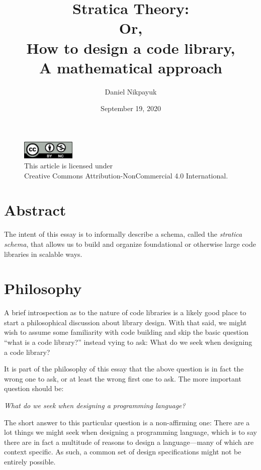 \documentclass[twoside]{article}
\title{Stratica Theory:\\[1em]Or,\\How to design a code library,\\A mathematical approach}
\author{Daniel Nikpayuk}
\date{September 19, 2020}
\begin{document}
\maketitle
\thispagestyle{empty}

\begin{figure}[h]
\centering
\includegraphics[width=1in]{../../../../cc-by-nc.png}\\[0.1in]
\tiny This article is licensed under \\
Creative Commons Attribution-NonCommercial 4.0 International.\\[0.3in]
\end{figure}

\section*{Abstract}

The intent of this essay is to informally describe a schema, called the \emph{stratica schema},
that allows us to build and organize foundational or otherwise large code libraries in scalable ways.

\section*{Philosophy}

A brief introspection as to the nature of code libraries is a likely good place to start a philosophical discussion
about library design. With that said, we might wish to assume some familiarity with code building and skip the basic
question ``what is a code library?'' instead vying to ask: What do we seek when designing a code library?

It is part of the philosophy of this essay that the above question is in fact the wrong one to ask, or at least
the wrong first one to ask. The more important question should be:
\begin{center}
\emph{What do we seek when designing a programming language?}
\end{center}

The short answer to this particular question is a non-affirming one: There are a lot things we might seek when designing
a programming language, which is to say there are in fact a multitude of reasons to design a language---many
of which are context specific. As such, a common set of design specifications might not be entirely possible.
\end{document}
